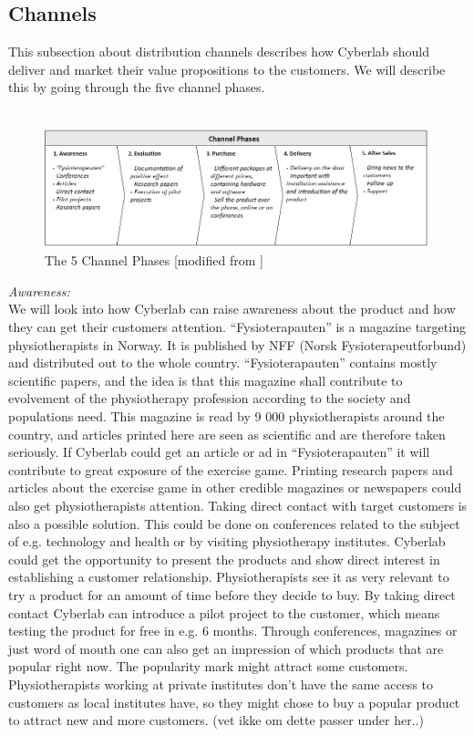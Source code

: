 \subsection{Channels}
This subsection about distribution channels describes how Cyberlab should deliver and market their value propositions to the customers. We will describe this by going through the five channel phases.\\ \\
\begin{figure}[h]
\caption[Channels]{The 5 Channel Phases [modified from \cite{osterwalder} \cite{osterwalderthesis}]}
\label{fig:Channels}
\begin{center}
\includegraphics[scale=0.7]{channels}
\end{center}
\end{figure}
\emph{Awareness:} \\ 
We will look into how Cyberlab can raise awareness about the product and how they can get their customers attention.  “Fysioterapauten” is a magazine targeting physiotherapists in Norway. It is published by NFF (Norsk Fysioterapeutforbund) and distributed out to the whole country. “Fysioterapauten” contains mostly scientific papers, and the idea is that this magazine shall contribute to evolvement of the physiotherapy profession according to the society and populations need. This magazine is read by 9 000 physiotherapists around the country, and articles printed here are seen as scientific and are therefore taken seriously.  If Cyberlab could get an article or ad in “Fysioterapauten” it will contribute to great exposure of the exercise game.  Printing research papers and articles about the exercise game in other credible magazines or newspapers could also get physiotherapists attention.  Taking direct contact with target customers is also a possible solution. This could be done on conferences related to the subject of e.g. technology and health or by visiting physiotherapy institutes. Cyberlab could get the opportunity to present the products and show direct interest in establishing a customer relationship. Physiotherapists see it as very relevant to try a product for an amount of time before they decide to buy. By taking direct contact Cyberlab can introduce a pilot project to the customer, which means testing the product for free in e.g. 6 months. Through conferences, magazines or just word of mouth one can also get an impression of which products that are popular right now. The popularity mark might attract some customers. Physiotherapists working at private institutes don’t have the same access to customers as local institutes have, so they might chose to buy a popular product to attract new and more customers. (vet ikke om dette passer under her..)\\ \\ 
